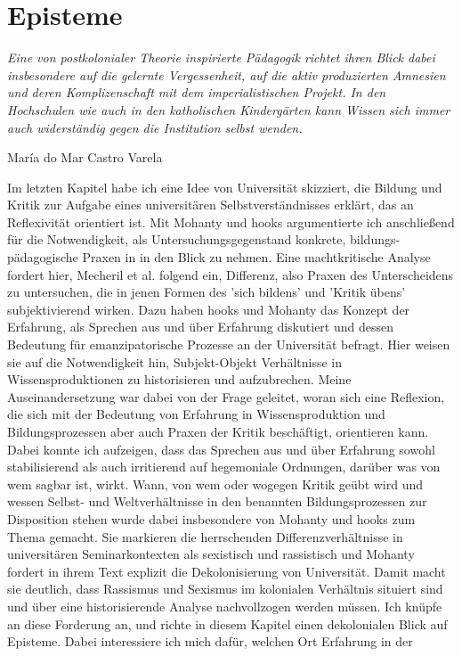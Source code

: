 \section{Episteme} \epigraph{\textit{ Eine von postkolonialer Theorie
inspirierte \glqq Pädagogik \grqq richtet ihren Blick dabei insbesondere auf die
gelernte Vergessenheit, auf die aktiv produzierten Amnesien und deren
Komplizenschaft mit dem imperialistischen Projekt. In den Hochschulen wie auch
in den katholischen Kindergärten kann \glqq Wissen \grqq sich immer auch
widerständig gegen die \glqq Institution \grqq selbst wenden. }}{María do Mar
Castro Varela \footnotemark}  

Im letzten Kapitel habe ich eine Idee von Universität skizziert,
die Bildung und Kritik zur Aufgabe eines universitären Selbstverständnisses
erklärt, das an Reflexivität orientiert ist. Mit Mohanty und hooks argumentierte
ich anschließend für die Notwendigkeit, als Untersuchungsgegenstand konkrete,
bildungs-pädagogische Praxen in in den Blick zu nehmen. Eine machtkritische
Analyse fordert hier, Mecheril et al. folgend ein, Differenz, also Praxen des
Unterscheidens zu untersuchen, die in jenen Formen des 'sich bildens' und
'Kritik übens' subjektivierend wirken. Dazu haben hooks und Mohanty das Konzept
der Erfahrung, als Sprechen aus und über Erfahrung diskutiert und dessen
Bedeutung für emanzipatorische Prozesse an der Universität befragt. Hier weisen
sie auf die Notwendigkeit hin, Subjekt-Objekt Verhältnisse in
Wissensproduktionen zu historisieren und aufzubrechen.  Meine Auseinandersetzung
war dabei von der Frage geleitet, woran sich eine Reflexion, die sich mit der
Bedeutung von Erfahrung in Wissensproduktion und Bildungsprozessen aber auch
Praxen der Kritik beschäftigt, orientieren kann. Dabei konnte ich aufzeigen,
dass das Sprechen aus und über Erfahrung sowohl stabilisierend als auch
irritierend auf hegemoniale Ordnungen, darüber was von wem sagbar ist, wirkt.
Wann, von wem oder wogegen Kritik geübt wird und wessen Selbst- und
Weltverhältnisse in den benannten Bildungsprozessen zur Disposition stehen wurde
dabei insbesondere von Mohanty und hooks zum Thema gemacht. Sie markieren die
herrschenden Differenzverhältnisse in universitären Seminarkontexten als
sexistisch und rassistisch und Mohanty fordert in ihrem Text explizit die
Dekolonisierung von Universität. Damit macht sie deutlich, dass Rassismus und
Sexismus im kolonialen Verhältnis situiert sind und über eine historisierende
Analyse nachvollzogen werden müssen. Ich knüpfe an diese Forderung an, und
richte in diesem Kapitel einen dekolonialen Blick auf Episteme. Dabei
interessiere ich mich dafür, welchen Ort Erfahrung in der
